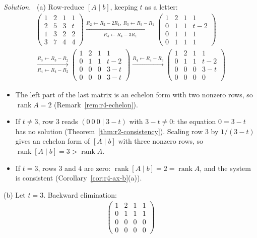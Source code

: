 \documentclass[12pt]{article}
\DeclareMathOperator{\rank}{rank}
\theoremstyle{definition}
\newenvironment{solution}{\par\noindent\textit{Solution.}\ }{\par\smallskip}
\begin{document}
\begin{solution}
(a) Row-reduce \([A\mid b]\), keeping \(t\) as a letter:
\[
\begin{gathered}
\left(\begin{array}{ccc|c}1&2&1&1\\2&5&3&t\\1&3&2&2\\3&7&4&4\end{array}\right)
\xrightarrow[R_4\leftarrow R_4-3R_1]{R_2\leftarrow R_2-2R_1,\ R_3\leftarrow R_3-R_1}
\left(\begin{array}{ccc|c}1&2&1&1\\0&1&1&t-2\\0&1&1&1\\0&1&1&1\end{array}\right)
\\
\xrightarrow[R_4\leftarrow R_4-R_2]{R_3\leftarrow R_3-R_2}
\left(\begin{array}{ccc|c}1&2&1&1\\0&1&1&t-2\\0&0&0&3-t\\0&0&0&3-t\end{array}\right)
\xrightarrow{R_4\leftarrow R_4-R_3}
\left(\begin{array}{ccc|c}1&2&1&1\\0&1&1&t-2\\0&0&0&3-t\\0&0&0&0\end{array}\right)
\end{gathered}
\]
\begin{itemize}
\item The left part of the last matrix is an echelon form with two nonzero rows, so \(\rank A=2\)
(Remark~\ref{rem:r4-echelon}).
\item If \(t\ne3\), row \(3\) reads \((0\ 0\ 0\mid3-t)\) with \(3-t\ne0\): the equation \(0=3-t\) has no solution
(Theorem~\ref{thm:r2-consistency}). Scaling row \(3\) by \(1/(3-t)\) gives an echelon form of \([A\mid b]\) with three
nonzero rows, so \(\rank[A\mid b]=3>\rank A\).
\item If \(t=3\), rows \(3\) and \(4\) are zero: \(\rank[A\mid b]=2=\rank A\), and the system is consistent
(Corollary~\ref{cor:r4-ax-b}(a)).
\end{itemize}
(b) Let \(t=3\). Backward elimination:
\[
\begin{gathered}
\left(\begin{array}{ccc|c}1&2&1&1\\0&1&1&1\\0&0&0&0\\0&0&0&0\end{array}\right)

\end{gathered}\]
\end{solution}
\end{document}
